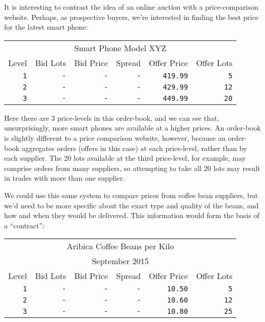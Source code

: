 \documentclass[12pt,a4paper,notitlepage,bibliography=totoc]{scrreprt}
\begin{document}
It is interesting to contrast the idea of an online \gls{auction} with a price-comparison
website. Perhaps, as prospective buyers, we're interested in finding the best price for the latest
smart phone:

\vspace{5mm}
\begin{tabular}{r|rrrrr}
\multicolumn{6}{c}{Smart Phone Model XYZ}\\
Level&Bid Lots&Bid Price&Spread&Offer Price&Offer Lots\\
\hline
\texttt{1}&\texttt{-}&\texttt{-}&\texttt{-}&\texttt{419.99}&\texttt{5}\\
\texttt{2}&\texttt{-}&\texttt{-}&\texttt{-}&\texttt{429.99}&\texttt{12}\\
\texttt{3}&\texttt{-}&\texttt{-}&\texttt{-}&\texttt{449.99}&\texttt{20}\\
\end{tabular}
\vspace{5mm}

Here there are 3 \glspl{price-level} in this \gls{order-book}, and we can see that, unsurprisingly,
more smart phones are available at a higher prices. An \gls{order-book} is slightly different to a
price comparison website, however, because an \gls{order-book} aggregates \glspl{order}
(\glspl{offer} in this case) at each \gls{price-level}, rather than by each supplier. The 20
\glspl{lot} available at the third \gls{price-level}, for example, may comprise \glspl{order} from
many suppliers, so attempting to take all 20 \glspl{lot} may result in trades with more than one
supplier.

We could use this same system to compare prices from coffee bean suppliers, but we'd need to be more
specific about the exact type and quality of the beans, and how and when they would be
delivered. This information would form the basis of a ``\gls{contract}'':

\vspace{5mm}
\begin{tabular}{r|rrrrr}
\multicolumn{6}{c}{Aribica Coffee Beans per Kilo}\\
\multicolumn{6}{c}{September 2015}\\
Level&Bid Lots&Bid Price&Spread&Offer Price&Offer Lots\\
\hline
\texttt{1}&\texttt{-}&\texttt{-}&\texttt{-}&\texttt{10.50}&\texttt{5}\\
\texttt{2}&\texttt{-}&\texttt{-}&\texttt{-}&\texttt{10.60}&\texttt{12}\\
\texttt{3}&\texttt{-}&\texttt{-}&\texttt{-}&\texttt{10.80}&\texttt{25}\\
\end{tabular}
\vspace{5mm}
\end{document}
